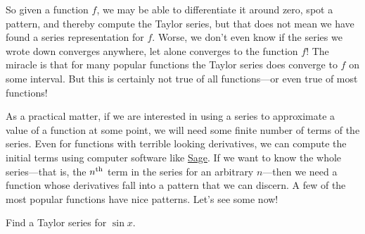 So given a function $f$, we may be able to differentiate it around
zero, spot a pattern, and thereby compute the Taylor series, but that
does not mean we have found a series representation for $f$.  Worse,
we don't even know if the series we wrote down converges anywhere, let
alone converges to the function $f$!  The miracle is that for many
popular functions the Taylor series does converge to $f$ on
some interval.  But this is certainly not true of all functions---or
even true of most  functions!

As a practical matter, if we are interested in using a series to
approximate a value of a function at some point, we will need some
finite number of terms of the series.  Even for functions with
terrible looking derivatives, we can compute the initial terms using
computer software like \href{http://sagemath.org/}{Sage}. If we want
to know the whole series---that is, the $n^{\mbox{\scriptsize th}}$ term in the series
for an arbitrary $n$---then we need a function whose derivatives fall
into a pattern that we can discern.  A few of the most popular
functions have nice patterns.  Let's see some now!

\begin{example}\label{example:taylor-series-for-sine}
  Find a Taylor series for $\sin x$.
\end{example}

